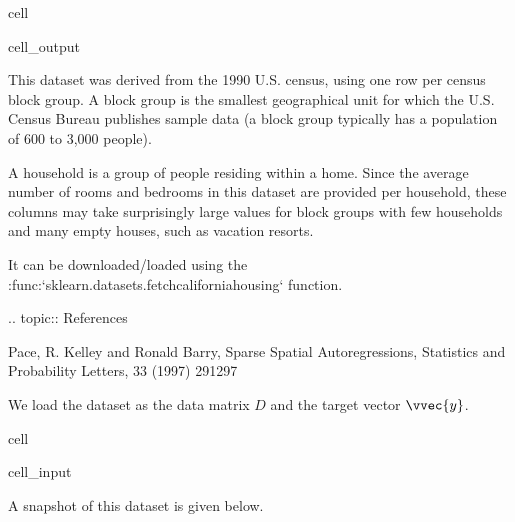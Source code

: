 \documentclass[letterpaper,10pt,english]{jupyterBook}
\begin{document}
\begin{sphinxuseclass}{cell}
\begin{sphinxVerbatimOutput}
\begin{sphinxuseclass}{cell_output}
\begin{sphinxVerbatim}[commandchars=\\\{\}]
This dataset was derived from the 1990 U.S. census, using one row per census
block group. A block group is the smallest geographical unit for which the U.S.
Census Bureau publishes sample data (a block group typically has a population
of 600 to 3,000 people).

A household is a group of people residing within a home. Since the average
number of rooms and bedrooms in this dataset are provided per household, these
columns may take surprisingly large values for block groups with few households
and many empty houses, such as vacation resorts.

It can be downloaded/loaded using the
:func:`sklearn.datasets.fetch\PYGZus{}california\PYGZus{}housing` function.

.. topic:: References

    \PYGZhy{} Pace, R. Kelley and Ronald Barry, Sparse Spatial Autoregressions,
      Statistics and Probability Letters, 33 (1997) 291\PYGZhy{}297
\end{sphinxVerbatim}

\end{sphinxuseclass}\end{sphinxVerbatimOutput}

\end{sphinxuseclass}
\sphinxAtStartPar
We load the dataset as the data matrix \(D\) and the target vector \(\vvec{y}\).

\begin{sphinxuseclass}{cell}\begin{sphinxVerbatimInput}

\begin{sphinxuseclass}{cell_input}
\begin{sphinxVerbatim}[commandchars=\\\{\}]
  
  
  
\end{sphinxVerbatim}

\end{sphinxuseclass}\end{sphinxVerbatimInput}

\end{sphinxuseclass}
\sphinxAtStartPar
A snapshot of this dataset is given below.
\end{document}

